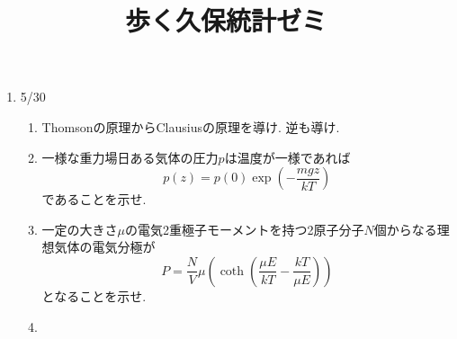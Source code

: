 \documentclass[11pt,a4paper]{jarticle}
\title{歩く久保統計ゼミ}
\author{}
\date{}
\begin{document}
\maketitle
\begin{enumerate}
    \item 5/30
    \begin{enumerate}
        \item Thomsonの原理からClausiusの原理を導け. 逆も導け.
        \item 一様な重力場日ある気体の圧力$p$は温度が一様であれば
        \begin{equation}
            p(z)=p(0)\exp(-\frac{mgz}{kT})
        \end{equation}
        であることを示せ.
        \item 一定の大きさ$\mu$の電気2重極子モーメントを持つ2原子分子$N$個からなる理想気体の電気分極が
        \begin{equation*}
            P=\frac{N}{V}\mu(\coth(\frac{\mu E}{kT}-\frac{kT}{\mu E}))
        \end{equation*}
        となることを示せ.
        \item
    \end{enumerate}
\end{enumerate}
\end{document}
